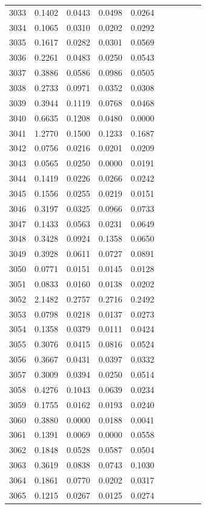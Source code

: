 \begin{table}
\begin{tabular}{cccccccccc}
3033& 0.1402& 0.0443& 0.0498& 0.0264\\ 
3034& 0.1065& 0.0310& 0.0202& 0.0292\\ 
3035& 0.1617& 0.0282& 0.0301& 0.0569\\ 
3036& 0.2261& 0.0483& 0.0250& 0.0543\\ 
3037& 0.3886& 0.0586& 0.0986& 0.0505\\ 
3038& 0.2733& 0.0971& 0.0352& 0.0308\\ 
3039& 0.3944& 0.1119& 0.0768& 0.0468\\ 
3040& 0.6635& 0.1208& 0.0480& 0.0000\\ 
3041& 1.2770& 0.1500& 0.1233& 0.1687\\ 
3042& 0.0756& 0.0216& 0.0201& 0.0209\\ 
3043& 0.0565& 0.0250& 0.0000& 0.0191\\ 
3044& 0.1419& 0.0226& 0.0266& 0.0242\\ 
3045& 0.1556& 0.0255& 0.0219& 0.0151\\ 
3046& 0.3197& 0.0325& 0.0966& 0.0733\\ 
3047& 0.1433& 0.0563& 0.0231& 0.0649\\ 
3048& 0.3428& 0.0924& 0.1358& 0.0650\\ 
3049& 0.3928& 0.0611& 0.0727& 0.0891\\ 
3050& 0.0771& 0.0151& 0.0145& 0.0128\\ 
3051& 0.0833& 0.0160& 0.0138& 0.0202\\ 
3052& 2.1482& 0.2757& 0.2716& 0.2492\\ 
3053& 0.0798& 0.0218& 0.0137& 0.0273\\ 
3054& 0.1358& 0.0379& 0.0111& 0.0424\\ 
3055& 0.3076& 0.0415& 0.0816& 0.0524\\ 
3056& 0.3667& 0.0431& 0.0397& 0.0332\\ 
3057& 0.3009& 0.0394& 0.0250& 0.0514\\ 
3058& 0.4276& 0.1043& 0.0639& 0.0234\\ 
3059& 0.1755& 0.0162& 0.0193& 0.0240\\ 
3060& 0.3880& 0.0000& 0.0188& 0.0041\\ 
3061& 0.1391& 0.0069& 0.0000& 0.0558\\ 
3062& 0.1848& 0.0528& 0.0587& 0.0504\\ 
3063& 0.3619& 0.0838& 0.0743& 0.1030\\ 
3064& 0.1861& 0.0770& 0.0202& 0.0317\\ 
3065& 0.1215& 0.0267& 0.0125& 0.0274\\ 

\end{tabular}
\end{table}
